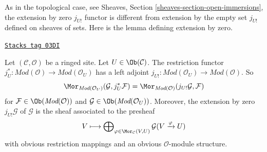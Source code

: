 As in the topological case, see
Sheaves, Section \ref{sheaves-section-open-immersions},
the extension by zero $j_{U!}$ functor is different from
extension by the empty set $j_{U!}$ defined on sheaves of sets.
Here is the lemma defining extension by zero.

\begin{lemma}
\label{sites-modules-lemma-extension-by-zero}
\href{https://stacks.math.columbia.edu/tag/03DI}{\texttt{Stacks tag 03DI}}

Let $(\mathcal{C}, \mathcal{O})$ be a ringed site.
Let $U \in \Ob(\mathcal{C})$.
The restriction functor
$j_U^* : \textit{Mod}(\mathcal{O}) \to \textit{Mod}(\mathcal{O}_U)$
has a left adjoint
$j_{U!} : \textit{Mod}(\mathcal{O}_U) \to \textit{Mod}(\mathcal{O})$.
So
$$
\Mor_{\textit{Mod}(\mathcal{O}_U)}(\mathcal{G}, j_U^*\mathcal{F})
=
\Mor_{\textit{Mod}(\mathcal{O})}(j_{U!}\mathcal{G}, \mathcal{F})
$$
for $\mathcal{F} \in \Ob(\textit{Mod}(\mathcal{O}))$
and $\mathcal{G} \in \Ob(\textit{Mod}(\mathcal{O}_U))$.
Moreover, the extension by zero $j_{U!}\mathcal{G}$ of $\mathcal{G}$
is the sheaf associated to the presheaf
$$
V
\longmapsto
\bigoplus\nolimits_{\varphi \in \Mor_\mathcal{C}(V, U)}
\mathcal{G}(V \xrightarrow{\varphi} U)
$$
with obvious restriction mappings and an obvious $\mathcal{O}$-module
structure.
\end{lemma}


